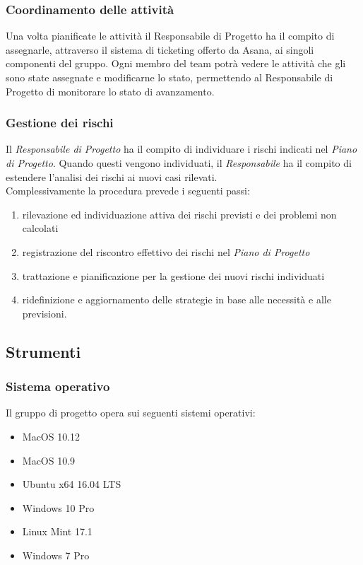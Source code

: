 \subsubsection{Coordinamento delle attività}

Una volta pianificate le attività il Responsabile di Progetto ha il compito di assegnarle, attraverso il sistema di ticketing offerto da Asana, ai singoli componenti del gruppo. Ogni membro del team potrà vedere le attività che gli sono state assegnate e modificarne lo stato, permettendo al Responsabile di Progetto di monitorare lo stato di avanzamento.

\subsubsection{Gestione dei rischi}

Il \emph{ \emph{Responsabile}  di Progetto} ha il compito di individuare i
rischi indicati nel \emph{Piano di Progetto}. Quando questi vengono
individuati, il \emph{Responsabile} ha il compito di estendere
l'analisi dei rischi ai nuovi casi rilevati.\\Complessivamente la
procedura prevede i seguenti passi: 
\begin{enumerate}
	\item rilevazione ed individuazione attiva dei rischi previsti e dei
	problemi non calcolati
	\item registrazione del riscontro effettivo
	dei rischi nel \emph{Piano di Progetto}
	\item trattazione e
	pianificazione per la gestione dei nuovi rischi individuati
	\item
	ridefinizione e aggiornamento delle strategie in base alle necessità
	e alle previsioni. 
\end{enumerate}


\subsection{Strumenti}
\subsubsection{Sistema operativo}
Il gruppo di progetto opera sui seguenti sistemi operativi:
\begin{itemize}
	\item MacOS 10.12
	\item MacOS 10.9
	\item Ubuntu x64 16.04 LTS 
	\item Windows 10 Pro
	\item Linux Mint 17.1
	\item Windows 7 Pro
\end{itemize}

